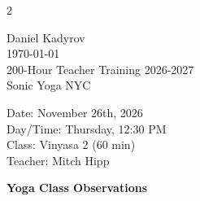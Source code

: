 \documentclass[10pt]{article}
\begin{document}
 
\thispagestyle{empty}

\begin{multicols}{2}

    \noindent
    Daniel Kadyrov\\
    \today\\
    200-Hour Teacher Training 2026-2027\\
    Sonic Yoga NYC
 
    \columnbreak
    \begin{flushright}
      Date: November 26th, 2026\\
      Day/Time: Thursday, 12:30 PM\\
      Class: Vinyasa 2 (60 min)\\
      Teacher: Mitch Hipp\\
    \end{flushright}
\end{multicols}


\vspace{1em}
\begin{center}
  \textbf{Yoga Class Observations}
\end{center}
\end{document}
